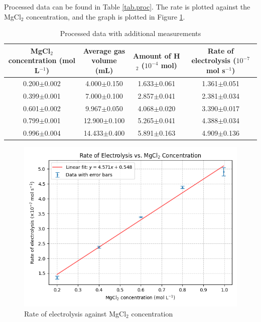 \documentclass[a4paper]{article}
\begin{document}
Processed data can be found in Table \ref{tab.proc}. The rate is plotted against the MgCl$_2$ concentration, and the graph is plotted in Figure \ref{fig.proc}.

\begin{table}[h!]
\centering
\caption{Processed data with additional measurements}
\label{tab.proc.extended}
\begin{tabular}{cccc}
\hline
\makecell{MgCl$_2$ concentration\\ (mol L$^{-1}$)} & 
\makecell{Average gas volume\\ (mL)} & 
\makecell{Amount of H$_2$\\ ($10^{-4}$ mol)} & 
\makecell{Rate of electrolysis\\ ($10^{-7}$ mol s$^{-1}$)} \\
\hline
0.200$\pm$0.002 & 4.000$\pm$0.150 & 1.633$\pm$0.061 & 1.361$\pm$0.051 \\
0.399$\pm$0.001 & 7.000$\pm$0.100 & 2.857$\pm$0.041 & 2.381$\pm$0.034 \\
0.601$\pm$0.002 & 9.967$\pm$0.050 & 4.068$\pm$0.020 & 3.390$\pm$0.017 \\
0.799$\pm$0.001 & 12.900$\pm$0.100 & 5.265$\pm$0.041 & 4.388$\pm$0.034 \\
0.996$\pm$0.004 & 14.433$\pm$0.400 & 5.891$\pm$0.163 & 4.909$\pm$0.136 \\
\hline
\end{tabular}
\end{table}

\begin{figure}
    \centering
    \includegraphics[width=\textwidth]{fit.png}
    \caption{Rate of electrolysis against MgCl$_2$ concentration}
    \label{fig.proc}
\end{figure}
\end{document}
